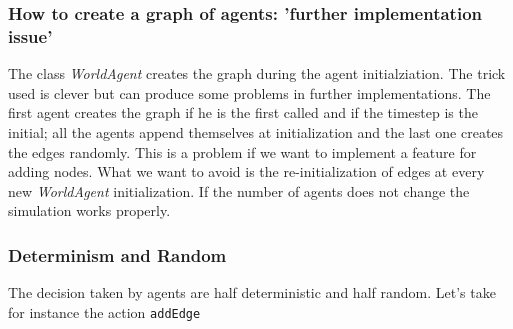 \subsubsection{How to create a graph of agents:
  'further implementation issue'}
The class \textit{WorldAgent} creates the graph during the agent
initialziation. The trick used is clever but can produce some
problems in further implementations. The first agent creates the graph
if he is the first called and if the timestep is the initial; all the
agents append themselves at initialization and the last one creates the edges
randomly. This is a problem if we want to implement a feature for adding nodes.
What we want to avoid is the re-initialization of edges at every new
\textit{WorldAgent} initialization. If the number of agents does not change the
simulation works properly.

\subsubsection{Determinism and Random}
The decision taken by agents are half deterministic and half random.
Let's take for instance the action \texttt{addEdge}
